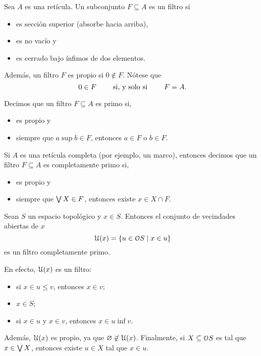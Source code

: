 \begin{definition}
    Sea $A$ es una retícula.
    Un subconjunto $F\subseteq A$ es un filtro si
    \begin{itemize}
        \item es sección superior (absorbe hacia arriba),
        \item es no vacío y
        \item es cerrado bajo ínfimos de dos elementos.
    \end{itemize}
    Además, un filtro $F$ es propio si $0\nin F$.
    Nótese que
    \[
        0\in F \ssi F=A
    .\]
    
    Decimos que un filtro $F\subseteq A$ es primo si,
    \begin{itemize}
        \item es propio y
        \item siempre que $a\sup b\in F$, entonces $a\in F$ o $b\in F$.
    \end{itemize}
    
    Si $A$ es una retícula completa (por ejemplo, un marco),
    entonces decimos que un filtro $F\subseteq A$ es completamente
    primo si,
    \begin{itemize}
        \item es propio y
        \item siempre que $\Sup X\in F$, entonces existe $x\in X\cap F$.
    \end{itemize}
\end{definition}

\begin{example}
    Sean $S$ un espacio topológico y $x\in S$.
    Entonces el conjunto de vecindades abiertas de $x$
    \[
        \cal U(x) = \{u\in \cal OS\mid x\in u\}
    \]
    es un filtro completamente primo.
    
    En efecto, $\cal U(x)$ es un filtro:
    \begin{itemize}
        \item si $x\in u\leq v$, entonces $x\in v$;
        \item $x\in S$;
        \item si $x\in u$ y $x\in v$, entonces $x\in u\inf v$.
    \end{itemize}
    Además,  $\cal U(x)$ es propio, ya que $\emptyset\nin\cal U(x)$.
    Finalmente, si $X\subseteq \cal OS$ es tal que $x\in \Sup X$,
    entonces existe $u\in X$ tal que $x\in u$.
\end{example}


